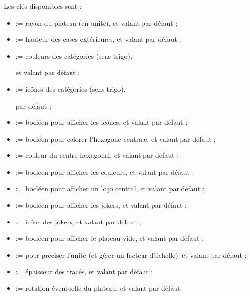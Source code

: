 \documentclass[11pt,a4paper]{ltxdoc}
\begin{document}
Les \textsf{clés} disponibles sont :

\begin{itemize}
	\item {} := rayon du plateau (en unité), et valant  par défaut ;
	\item {} := hauteur des cases extérieures, et valant  par défaut ;
	\item {} := couleurs des catégories (sens trigo),
	
	\hfill{}et valant  par défaut ;
	\item {} := icônes des catégories (sens trigo),
	
	\hfill{} par défaut ;
	\item {} := booléen pour afficher les icônes, et valant  par défaut ;
	\item {} := booléen pour colorer l'hexagone centrale, et valant  par défaut ;
	\item {} := couleur du centre hexagonal, et valant  par défaut ;
	\item {} := booléen pour afficher les couleurs, et valant  par défaut ;
	\item {} := booléen pour afficher un logo central, et valant  par défaut ;
	\item {} := booléen pour afficher les jokers, et valant  par défaut ;
	\item {} := icône des jokers, et valant  par défaut ;
	\item {} := booléen pour afficher le plateau vide, et valant  par défaut ;
	\item {} := pour préciser l'unité (et gérer un facteur d'échelle), et valant  par défaut ;
	\item {} := épaisseur des tracés, et valant \MontreCode{0.8pt} par défaut ;
	\item {} := rotation éventuelle du plateau, et valant  par défaut.
\end{itemize}
\end{document}
